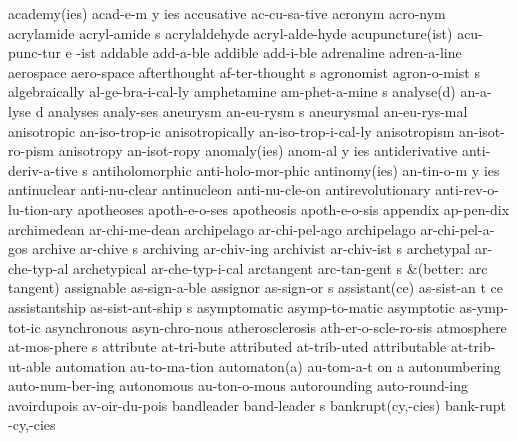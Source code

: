 \begingroup
\eightpoint
\3 academy(ies)		acad-e-m y ies
\1 accusative		ac-cu-sa-tive		%
\1 acronym		acro-nym		%
\5 acrylamide		acryl-amide s		%
\1 acrylaldehyde	acryl-alde-hyde		%
\3 acupuncture(ist)	acu-punc-tur e -ist	%
\1 addable		add-a-ble
\1 addible		add-i-ble
\1 adrenaline		adren-a-line
\1 aerospace		aero-space
\5 afterthought 	af-ter-thought s
\5 agronomist		agron-o-mist s
\1 algebraically	al-ge-bra-i-cal-ly	%
\5 amphetamine		am-phet-a-mine s
\2 analyse(d)		an-a-lyse d
\1 analyses		analy-ses\thinspace*
\5 aneurysm		an-eu-rysm s		%
\1 aneurysmal		an-eu-rys-mal		%
\1 anisotropic		an-iso-trop-ic		%
\1 anisotropically	an-iso-trop-i-cal-ly	%
\1 anisotropism		an-isot-ro-pism 	%
\1 anisotropy		an-isot-ropy		%
\3 anomaly(ies)		anom-al y ies
\5 antiderivative	anti-deriv-a-tive s
\1 antiholomorphic	anti-holo-mor-phic	%
\3 antinomy(ies)	an-tin-o-m y ies
\1 antinuclear		anti-nu-clear
\1 antinucleon		anti-nu-cle-on
\1 antirevolutionary	anti-rev-o-lu-tion-ary
\1 apotheoses		apoth-e-o-ses
\1 apotheosis		apoth-e-o-sis
\1 appendix		ap-pen-dix
\1 archimedean		ar-chi-me-dean		%
\1 archipelago		ar-chi-pel-ago       %
\1 archipelago		ar-chi-pel-a-gos
\5 archive		ar-chive s              %
\1 archiving		ar-chiv-ing             %
\5 archivist		ar-chiv-ist s           %
\1 archetypal		ar-che-typ-al
\1 archetypical		ar-che-typ-i-cal
\5 arctangent		arc-tan-gent s
\tabalign		&\null\quad (better: arc\,tangent)\cr
\1 assignable		as-sign-a-ble
\5 assignor		as-sign-or s
\3 assistant(ce)	as-sist-an t ce		%
\5 assistantship	as-sist-ant-ship s
\1 asymptomatic		asymp-to-matic
\1 asymptotic		as-ymp-tot-ic
\1 asynchronous		asyn-chro-nous
\1 atherosclerosis	ath-er-o-scle-ro-sis
\5 atmosphere		at-mos-phere s
\1 attribute		at-tri-bute		%
\1 attributed		at-trib-uted
\1 attributable		at-trib-ut-able
\1 automation		au-to-ma-tion           %
\3 automaton(a)		au-tom-a-t on a         %
\1 autonumbering	auto-num-ber-ing	%
\1 autonomous		au-ton-o-mous		%
\1 autorounding		auto-round-ing		%
\1 avoirdupois		av-oir-du-pois
\5 bandleader		band-leader s
\2 bankrupt(cy,-cies)	bank-rupt -cy,-cies
